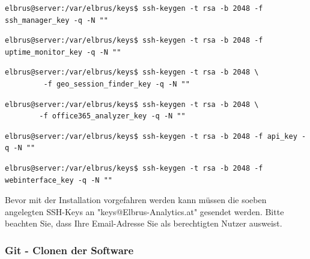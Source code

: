 \documentclass{article}
\begin{document}
	\lstset{style=commands}
	\begin{lstlisting}[caption={Erstellen des SSH-keys der für das Herunterladen des 'SSH-Managers' benötigt wird.}]
		elbrus@server:/var/elbrus/keys$ ssh-keygen -t rsa -b 2048 -f ssh_manager_key -q -N ""
	\end{lstlisting}
	
	\lstset{style=commands}
	\begin{lstlisting}[caption={Erstellen des SSH-keys der für das Herunterladen des 'Uptime-Monitors' benötigt wird.}]
		elbrus@server:/var/elbrus/keys$ ssh-keygen -t rsa -b 2048 -f uptime_monitor_key -q -N ""
	\end{lstlisting}
	
	\lstset{style=commands}
	\begin{lstlisting}[caption={Erstellen des SSH-keys der für das Herunterladen des 'geo session finders' benötigt wird.}]
		elbrus@server:/var/elbrus/keys$ ssh-keygen -t rsa -b 2048 \
		 -f geo_session_finder_key -q -N ""
	\end{lstlisting}

	\lstset{style=commands}
	\begin{lstlisting}[caption={Erstellen des SSH-keys der für das Herunterladen des 'office365 analyzers' benötigt wird.}]
		elbrus@server:/var/elbrus/keys$ ssh-keygen -t rsa -b 2048 \
		-f office365_analyzer_key -q -N ""
	\end{lstlisting}
	
	\lstset{style=commands}
	\begin{lstlisting}[caption={Erstellen des SSH-keys der für das Herunterladen der 'API' benötigt wird.}]
		elbrus@server:/var/elbrus/keys$ ssh-keygen -t rsa -b 2048 -f api_key -q -N ""
	\end{lstlisting}
	
	\lstset{style=commands}
	\begin{lstlisting}[caption={Erstellen des SSH-keys der für das Herunterladen des 'Webinterfaces' benötigt wird.}]
		elbrus@server:/var/elbrus/keys$ ssh-keygen -t rsa -b 2048 -f webinterface_key -q -N ""
	\end{lstlisting}

	Bevor mit der Installation vorgefahren werden kann müssen die soeben angelegten SSH-Keys an "keys@Elbrus-Analytics.at" gesendet werden. Bitte beachten Sie, dass Ihre Email-Adresse Sie als berechtigten Nutzer ausweist.
	
	\subsubsection{Git - Clonen der Software}
\end{document}
